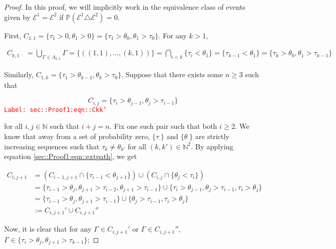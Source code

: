 \documentclass[12pt]{article}
\newcommand{\mb}{\mathbb}
\newcommand{\mc}{\mathcal}
\newcommand{\tr}{\textcolor{red}}
\newcommand{\labe}[1]{\tr{\texttt{Label: #1}}}
\newcommand{\ind}{\hspace{24pt}}
\newcommand{\pr}{\mb{P}}							%
\newcommand{\indx}[1]{_{#1}}					%
\newcommand{\rt}{\tau}							%
\newcommand{\rtt}{\theta}						%
\renewcommand{\it}{k}							%
\newcommand{\apath}{\Gamma}						%
\newcommand{\pathset}[2]{\Lambda_{#1,#2}}		%
\newcommand{\pathsete}[2]{C_{#1,#2}}			%
\newcommand{\evnt}{\mc{E}}						%
\begin{document}
\begin{proof}
In this proof, we will implicitly work in the equivalence class of events given by \(\evnt^1 = \evnt^2\) if \(\pr(\evnt^1 \triangle \evnt^2) = 0\).  

\ind First, \(\pathsete{1}{1} = \{\rt\indx{1} > 0,\rtt\indx{1} > 0\} = \{\rt\indx{1} > \rtt\indx{0},\rtt\indx{1}>\rt\indx{0}\}\). For any \(\it > 1\),

\begin{align*}
\pathsete{\it}{1} &= \bigcup_{\apath\indx{} \in \pathset{\it}{1}} \apath\indx{} = \{((1,1),\dots,(\it,1))\} = \bigcap_{i < \it} \{\rt\indx{i} < \rtt\indx{1}\} = \{\rt\indx{\it-1} < \rtt\indx{1}\} = \{\rt\indx{\it} > \rtt\indx{0},\rtt\indx{1} > \rt\indx{\it-1}\}
\end{align*}

Similarly, \(\pathsete{1}{\it} = \{\rt\indx{1} > \rtt\indx{\it-1}, \rtt\indx{\it} > \rt\indx{0}\}\). Suppose that there exists some \(n\geq 3\) such that

\begin{equation}
\pathsete{i}{j} = \{\rt\indx{i} > \rtt\indx{j-1},\rtt\indx{j} > \rt\indx{i-1}\}
\label{sec::Proof1:eqn::Ckk'}
\end{equation}
\labe{sec::Proof1:eqn::Ckk'}

for all \(i, j\in \mb{N}\) such that \(i+j = n\). Fix one such pair such that both \(i \geq 2\). We know that away from a set of probability zero, \(\{\rt\indx{\cdot}\}\) and \(\{\rtt\indx{\cdot}\}\) are strictly increasing sequences such that \(\rt\indx{\it} \neq \rtt\indx{\it'}\) for all \((\it,\it')\in \mb{N}^2\). By applying equation \eqref{sec::Proof1:eqn::extpath}, we get

\begin{align*}
\pathsete{i}{j+1} &= \left(\pathsete{i-1}{j+1} \cap \{\rt\indx{i - 1} < \rtt\indx{j+1}\}\right) \cup \left(\pathsete{i}{j}\cap \{\rtt\indx{j} < \rt\indx{i}\}\right)\\
&= \{\rt\indx{i - 1} > \rtt\indx{j}, \rtt\indx{j+1} > \rt\indx{i - 2},  \rtt\indx{j+1} > \rt\indx{i -1}\}\cup\{\rt\indx{i} > \rtt\indx{j-1}, \rtt\indx{j} > \rt\indx{i - 1},\rt\indx{i} > \rtt\indx{j}\}\\
&= \{\rt\indx{i - 1} > \rtt\indx{j}, \rtt\indx{j+1} > \rt\indx{i - 1}\}\cup\{\rtt\indx{j} > \rt\indx{i - 1},\rt\indx{i} > \rtt\indx{j}\}\\
&:= \pathsete{i}{j+1}' \cup\pathsete{i}{j+1}''
\end{align*}

Now, it is clear that for any \(\apath\indx{} \in \pathsete{i}{j+1}'\) or \(\apath\indx{} \in \pathsete{i}{j+1}''\), \(\apath\indx{}\in \{\rt\indx{i} > \rtt\indx{j},\rtt\indx{j+1} > \rt\indx{\it-1}\}\);


\end{proof}
\end{document}
